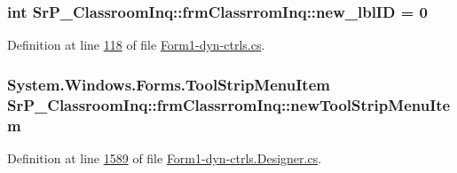 \hypertarget{class_sr_p___classroom_inq_1_1frm_classrrom_inq_a561cfd5c0d34d4adcb14aee4efc01643}{
\subsubsection[{new\-\_\-lbl\-I\-D}]{\setlength{\rightskip}{0pt plus 5cm}int {\bf \-Sr\-P\-\_\-\-Classroom\-Inq\-::frm\-Classrrom\-Inq\-::new\-\_\-lbl\-I\-D} = 0}}
\label{class_sr_p___classroom_inq_1_1frm_classrrom_inq_a561cfd5c0d34d4adcb14aee4efc01643}


\-Definition at line \hyperlink{_form1-dyn-ctrls_8cs_source_l00118}{118} of file \hyperlink{_form1-dyn-ctrls_8cs_source}{\-Form1-\/dyn-\/ctrls.\-cs}.

\hypertarget{class_sr_p___classroom_inq_1_1frm_classrrom_inq_ac3197c0c505ec97395ace77a88a8c068}{
\subsubsection[{new\-Tool\-Strip\-Menu\-Item}]{\setlength{\rightskip}{0pt plus 5cm}\-System.\-Windows.\-Forms.\-Tool\-Strip\-Menu\-Item {\bf \-Sr\-P\-\_\-\-Classroom\-Inq\-::frm\-Classrrom\-Inq\-::new\-Tool\-Strip\-Menu\-Item}}}
\label{class_sr_p___classroom_inq_1_1frm_classrrom_inq_ac3197c0c505ec97395ace77a88a8c068}


\-Definition at line \hyperlink{_form1-dyn-ctrls_8_designer_8cs_source_l01589}{1589} of file \hyperlink{_form1-dyn-ctrls_8_designer_8cs_source}{\-Form1-\/dyn-\/ctrls.\-Designer.\-cs}.

